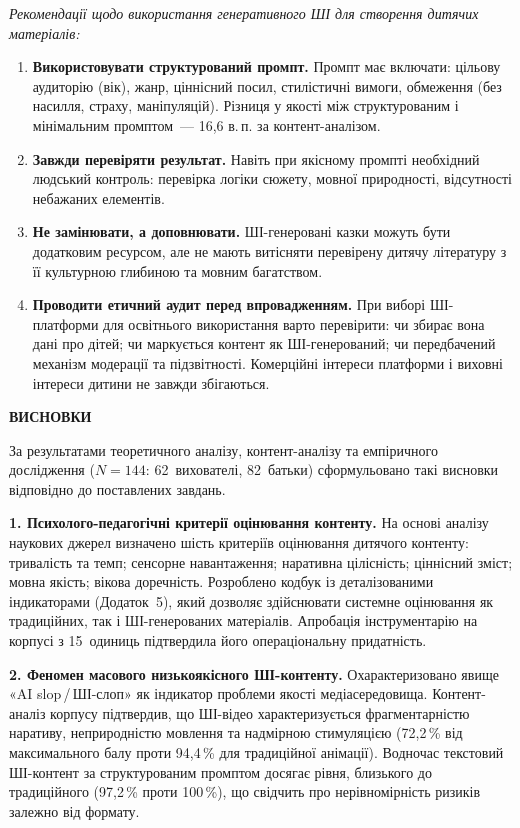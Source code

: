 \documentclass[14pt, a4paper]{extreport}
\newcommand{\myintro}[1]{%
  {\centering\bfseries\MakeUppercase#1\par}%
  \vspace{14pt}%
  \phantomsection
  \addcontentsline{toc}{chapter}{#1}%
}
\begin{document}
\textit{Рекомендації щодо використання генеративного ШІ для створення дитячих матеріалів:}
\begin{enumerate}
  \item \textbf{Використовувати структурований промпт.} Промпт має включати: цільову аудиторію (вік), жанр, ціннісний посил, стилістичні вимоги, обмеження (без насилля, страху, маніпуляцій). Різниця у якості між структурованим і мінімальним промптом~--- 16{,}6 в.\,п. за контент-аналізом.
  \item \textbf{Завжди перевіряти результат.} Навіть при якісному промпті необхідний людський контроль: перевірка логіки сюжету, мовної природності, відсутності небажаних елементів.
  \item \textbf{Не замінювати, а доповнювати.} ШІ-генеровані казки можуть бути додатковим ресурсом, але не мають витісняти перевірену дитячу літературу з її культурною глибиною та мовним багатством.
  \item \textbf{Проводити етичний аудит перед впровадженням.} При виборі ШІ-платформи для освітнього використання варто перевірити: чи збирає вона дані про дітей; чи маркується контент як ШІ-генерований; чи передбачений механізм модерації та підзвітності. Комерційні інтереси платформи і виховні інтереси дитини не завжди збігаються.
\end{enumerate}

\newpage
\myintro{ВИСНОВКИ}

За результатами теоретичного аналізу, контент-аналізу та емпіричного дослідження ($N=144$: 62~вихователі, 82~батьки) сформульовано такі висновки відповідно до поставлених завдань.

\textbf{1. Психолого-педагогічні критерії оцінювання контенту.}
На основі аналізу наукових джерел визначено шість критеріїв оцінювання дитячого контенту: тривалість та темп; сенсорне навантаження; наративна цілісність; ціннісний зміст; мовна якість; вікова доречність. Розроблено кодбук із деталізованими індикаторами (Додаток~5), який дозволяє здійснювати системне оцінювання як традиційних, так і ШІ-генерованих матеріалів. Апробація інструментарію на корпусі з 15~одиниць підтвердила його операціональну придатність.

\textbf{2. Феномен масового низькоякісного ШІ-контенту.}
Охарактеризовано явище «AI slop\,/\,ШІ-слоп» як індикатор проблеми якості медіасередовища. Контент-аналіз корпусу підтвердив, що ШІ-відео характеризується фрагментарністю наративу, неприродністю мовлення та надмірною стимуляцією (72{,}2\,\% від максимального балу проти 94{,}4\,\% для традиційної анімації). Водночас текстовий ШІ-контент за структурованим промптом досягає рівня, близького до традиційного (97{,}2\,\% проти 100\,\%), що свідчить про нерівномірність ризиків залежно від формату.
\end{document}
